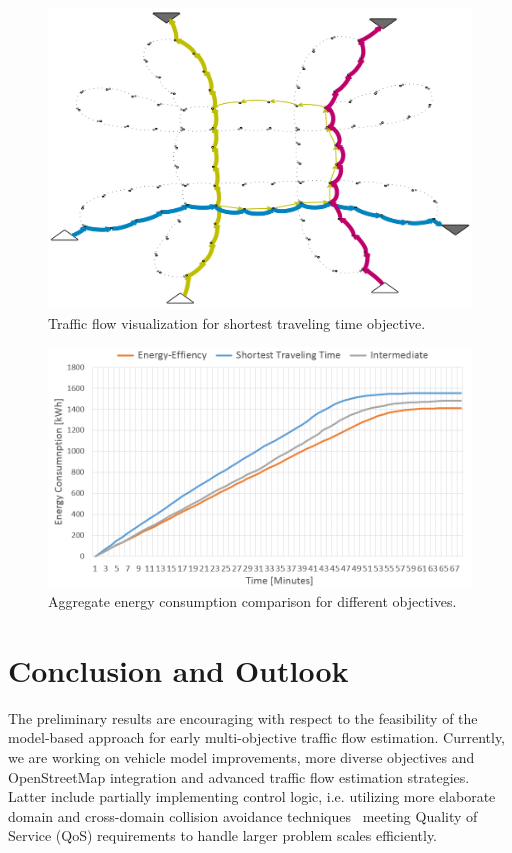 \documentclass[conference]{../cls/IEEEtran}
\begin{document}
\begin{figure}[t!]
	\centering
	\includegraphics[width=0.925\columnwidth]{../gfx/graph2.png}
	\caption{Traffic flow visualization for shortest traveling time objective.}
	\label{figure:graph}
\end{figure}

\begin{figure}[t!]
	\centering
	\includegraphics[width=0.925\columnwidth]{../gfx/chart2.png}
	\caption{Aggregate energy consumption comparison for different objectives.}
	\label{figure:chart}
\end{figure}

\section{Conclusion and Outlook}

The preliminary results are encouraging with respect to the feasibility of the
model-based approach for early multi-objective traffic flow estimation.
Currently, we are working on vehicle model
improvements, more diverse objectives and OpenStreetMap integration and advanced
traffic flow estimation strategies. Latter include partially implementing
control logic, i.e. utilizing more elaborate domain and cross-domain collision
avoidance techniques~\cite{Shi2012} meeting Quality of Service (QoS)
requirements to handle larger problem scales efficiently.




\end{document}
